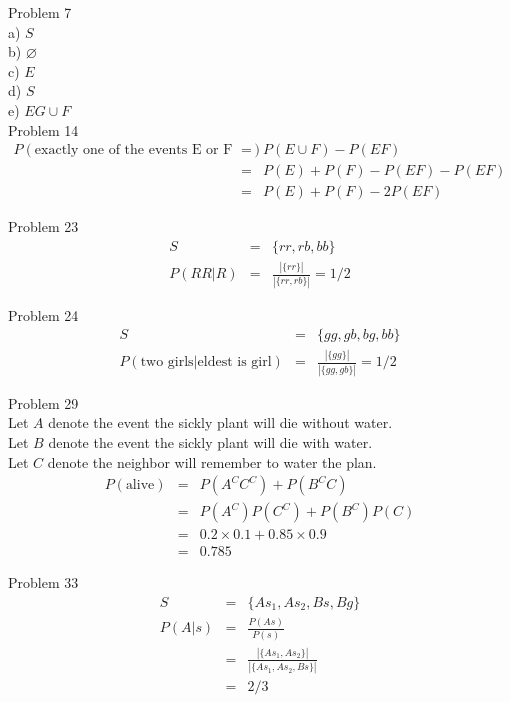 \documentclass[12pt]{article}
\begin{document}
Problem 7\\
a) $S$ \\
b) $\varnothing$ \\
c) $E$ \\
d) $S$ \\
e) $EG \cup F$ \\

Problem 14\\
\begin{eqnarray*}
P(\text {exactly one of the events E or F occurs})
&=& P(E \cup F) - P(EF) \\
&=& P(E) + P(F) - P(EF) - P(EF) \\
&=& P(E) + P(F) - 2P(EF)
\end{eqnarray*}

Problem 23\\
\begin{eqnarray*}
S &=& \{ rr, rb, bb \} \\
P(RR|R) &=& \frac {|\{ rr \}|} {|\{ rr, rb\}|} = 1/2
\end{eqnarray*}

Problem 24\\
\begin{eqnarray*}
S &=& \{ gg, gb, bg, bb \} \\
P(\text {two girls} | \text{eldest is girl})
&=& \frac {|\{ gg \}|} {|\{ gg, gb \}|} = 1/2
\end{eqnarray*}

Problem 29\\
Let $A$ denote the event the sickly plant will die without water. \\
Let $B$ denote the event the sickly plant will die with water. \\
Let $C$ denote the neighbor will remember to water the plan.
\begin{eqnarray*}
P(\text{alive})
&=& P(A^CC^C) + P(B^CC) \\
&=& P(A^C)P(C^C) + P(B^C)P(C) \\
&=& 0.2 \times 0.1 + 0.85 \times 0.9 \\
&=& 0.785
\end{eqnarray*}

Problem 33\\
\begin{eqnarray*}
S &=& \{  As_1, As_2, Bs, Bg \} \\
P(A|s)
&=& \frac {P(As)} {P(s)} \\
&=& \frac {|\{ As_1, As_2 \}|} {|\{ As_1, As_2, Bs \}|} \\
&=& 2/3
\end{eqnarray*}
\end{document}
